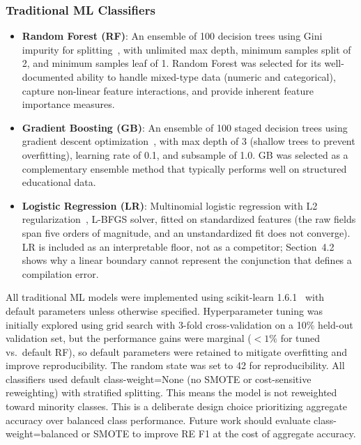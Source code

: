 \documentclass[acmsmall]{acmart}
\begin{document}
\subsubsection*{Traditional ML Classifiers}
\begin{itemize}
 \item \textbf{Random Forest (RF)}: An ensemble of 100 decision trees using
 Gini impurity for splitting~\cite{breiman2001random}, with unlimited
 max depth, minimum samples split of 2, and minimum samples leaf of 1.
 Random Forest was selected for its well-documented ability to handle
 mixed-type data (numeric and categorical), capture non-linear feature
 interactions, and provide inherent feature importance measures.
 \item \textbf{Gradient Boosting (GB)}: An ensemble of 100 staged
 decision trees using gradient descent
 optimization~\cite{friedman2001greedy}, with max depth
 of 3 (shallow trees to prevent overfitting), learning rate of 0.1,
 and subsample of 1.0. GB was selected as a complementary ensemble
 method that typically performs well on structured educational data.
 \item \textbf{Logistic Regression (LR)}: Multinomial logistic regression
 with L2 regularization~\cite{hosmer2013logistic}, L-BFGS solver, fitted on
 standardized features (the raw fields span five orders of magnitude, and an
 unstandardized fit does not converge). LR is included as an interpretable
 floor, not as a competitor; Section~4.2 shows why a linear boundary cannot
 represent the conjunction that defines a compilation error.
\end{itemize}

All traditional ML models were implemented using scikit-learn
1.6.1~\cite{pedregosa2011scikit} with default parameters unless otherwise
specified. Hyperparameter tuning was initially explored using grid search
with 3-fold cross-validation on a 10\% held-out validation set, but the
performance gains were marginal ($< 1\%$ for tuned vs.\ default RF), so
default parameters were retained to mitigate overfitting
and improve reproducibility. The random state was set to 42 for
reproducibility. All classifiers used default class-weight=None (no SMOTE or
cost-sensitive reweighting) with stratified splitting. This means the model is not reweighted toward minority classes. This is a deliberate design choice prioritizing aggregate accuracy over balanced class performance. Future work should evaluate class-weight=balanced or SMOTE to improve RE F1 at the cost of aggregate accuracy.
\end{document}
